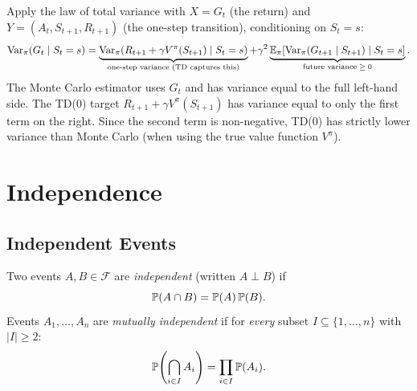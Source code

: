 \documentclass[11pt,a4paper]{article}
\begin{document}
\begin{rlconnection}[title={TD vs.\ Monte Carlo Variance}]
Apply the law of total variance with $X = G_t$ (the return) and
$Y = (A_t, S_{t+1}, R_{t+1})$ (the one-step transition),
conditioning on $S_t = s$:
\begin{equation}
  \operatorname{Var}_\pi(G_t \mid S_t = s)
  = \underbrace{\operatorname{Var}_\pi(R_{t+1} + \gamma V^\pi(S_{t+1})
    \mid S_t = s)}_{\text{one-step variance (TD captures this)}}
  + \gamma^2 \underbrace{\mathbb{E}_\pi[\operatorname{Var}_\pi(G_{t+1} \mid S_{t+1})
    \mid S_t = s]}_{\text{future variance} \;\geq\; 0}.
  \label{eq:td_mc_variance}
\end{equation}
The Monte Carlo estimator uses $G_t$ and has variance equal to
the full left-hand side.  The TD(0) target
$R_{t+1} + \gamma V^\pi(S_{t+1})$ has variance equal to only
the first term on the right.  Since the second term is
non-negative, TD(0) has strictly lower variance than Monte Carlo
(when using the true value function $V^\pi$).
\end{rlconnection}


\section{Independence}
\label{sec:independence}

\subsection{Independent Events}
\label{subsec:indep_events}

\begin{definition}
\label{def:indep_events}
Two events $A, B \in \mathcal{F}$ are \emph{independent}
(written $A \perp B$) if
\begin{equation}
  \mathbb{P}(A \cap B) = \mathbb{P}(A)\, \mathbb{P}(B).
  \label{eq:indep_events}
\end{equation}
Events $A_1, \ldots, A_n$ are \emph{mutually independent} if for
\emph{every} subset $I \subseteq \{1, \ldots, n\}$ with
$|I| \geq 2$:
\begin{equation}
  \mathbb{P}\!\left(\bigcap_{i \in I} A_i\right)
  = \prod_{i \in I} \mathbb{P}(A_i).
  \label{eq:mutual_indep}
\end{equation}
\end{definition}
\end{document}
